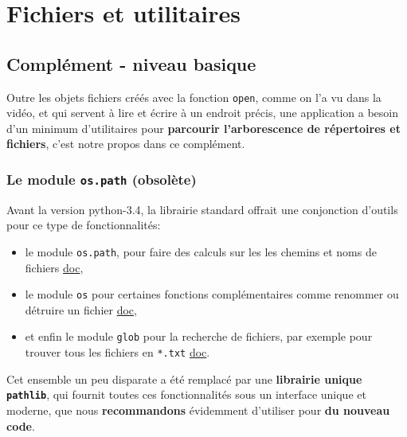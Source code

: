     
    
    
    

    

    \hypertarget{fichiers-et-utilitaires}{%
\section{Fichiers et utilitaires}\label{fichiers-et-utilitaires}}

    \hypertarget{compluxe9ment---niveau-basique}{%
\subsection{Complément - niveau
basique}\label{compluxe9ment---niveau-basique}}

    Outre les objets fichiers créés avec la fonction \texttt{open}, comme on
l'a vu dans la vidéo, et qui servent à lire et écrire à un endroit
précis, une application a besoin d'un minimum d'utilitaires pour
\textbf{parcourir l'arborescence de répertoires et fichiers}, c'est
notre propos dans ce complément.

    \hypertarget{le-module-os.path-obsoluxe8te}{%
\subsubsection{\texorpdfstring{Le module \texttt{os.path}
(obsolète)}{Le module os.path (obsolète)}}\label{le-module-os.path-obsoluxe8te}}

    Avant la version python-3.4, la librairie standard offrait une
conjonction d'outils pour ce type de fonctionnalités:

\begin{itemize}
\tightlist
\item
  le module \texttt{os.path}, pour faire des calculs sur les les chemins
  et noms de fichiers
  \href{https://docs.python.org/3/library/os.html}{doc},
\item
  le module \texttt{os} pour certaines fonctions complémentaires comme
  renommer ou détruire un fichier
  \href{https://docs.python.org/3/library/os.path.html}{doc},
\item
  et enfin le module \texttt{glob} pour la recherche de fichiers, par
  exemple pour trouver tous les fichiers en \texttt{*.txt}
  \href{https://docs.python.org/3/library/glob.html}{doc}.
\end{itemize}

    Cet ensemble un peu disparate a été remplacé par une \textbf{librairie
unique \texttt{pathlib}}, qui fournit toutes ces fonctionnalités sous un
interface unique et moderne, que nous \textbf{recommandons} évidemment
d'utiliser pour \textbf{du nouveau code}.

